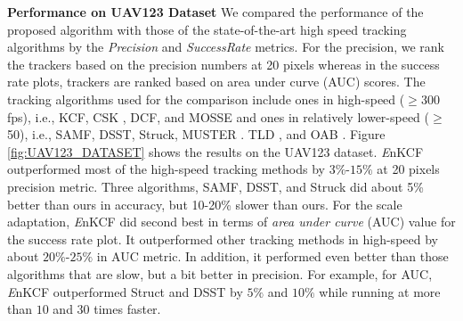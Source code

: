 \documentclass{bmvc2k}
\begin{document}
\textbf{Performance on UAV123 Dataset} We compared the performance of
the proposed algorithm with those of the state-of-the-art high speed
tracking algorithms by the \textit{Precision} and
\textit{Success\:Rate} metrics. For the precision, we rank the trackers
based on the precision numbers at 20 pixels whereas in the success
rate plots, trackers are ranked based on area under curve (AUC)
scores. The tracking algorithms used for the comparison include ones
in high-speed ($\geq$300 fps), i.e., KCF\cite{henriques2015high}, CSK
\cite{henriques2012exploiting}, DCF\cite{henriques2015high}, and
MOSSE\cite{bolme2010visual,henriques2015high} and ones in relatively
lower-speed ($\geq$50), i.e., SAMF\cite{li2014scale},
DSST\cite{danelljan2014accurate}, Struck\cite{hare2012efficient},
MUSTER \cite{hong2015multi}. TLD \cite{kalal2012tracking}, and OAB
\cite{zhang2012robust}. Figure \ref{fig:UAV123_DATASET} shows the
results on the UAV123 dataset. {\it E}nKCF outperformed most of the
high-speed tracking methods by $3\%$-$15\%$ at 20 pixels precision
metric. Three algorithms, SAMF, DSST, and Struck did about 5\% better
than ours in accuracy, but 10-20\% slower than ours. For the scale
adaptation, {\it E}nKCF did second best in terms of \textit{area under
  curve} (AUC) value for the success rate plot. It outperformed other
tracking methods in high-speed by about $20\%$-$25\%$ in AUC
metric. In addition, it performed even better than those algorithms
that are slow, but a bit better in precision. For example, for AUC,
{\it E}nKCF outperformed Struct and DSST by $5\%$ and $10\%$ while
running at more than $10$ and $30$ times faster.
\end{document}
